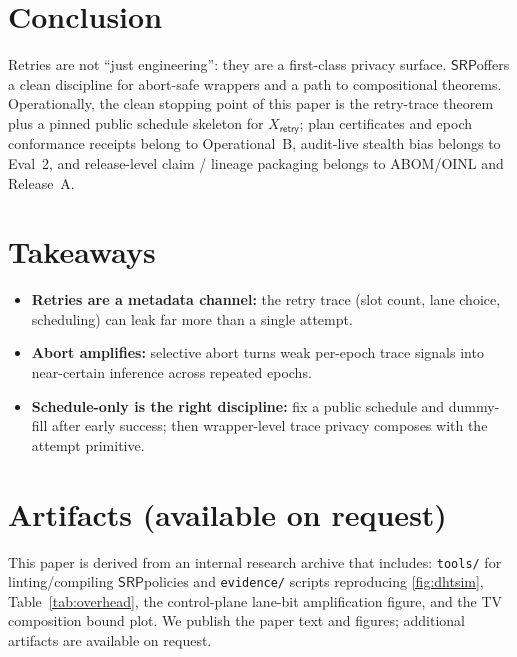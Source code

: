 \documentclass[11pt]{article}
\newcommand{\SRP}{\ensuremath{\mathsf{SRP}}}
\begin{document}
\section{Conclusion}
Retries are not ``just engineering'': they are a first-class privacy surface.
\SRP offers a clean discipline for abort-safe wrappers and a path to compositional theorems.
Operationally, the clean stopping point of this paper is the retry-trace theorem plus a pinned public schedule skeleton for $X_{\mathsf{retry}}$; plan certificates and epoch conformance receipts belong to Operational~B, audit-live stealth bias belongs to Eval~2, and release-level claim / lineage packaging belongs to ABOM/OINL and Release~A.\cite{series:operationalB,series:advantagecontracts,series:abomoinl,series:releaseproperty}

\section{Takeaways}
\begin{itemize}[leftmargin=*]
\item \textbf{Retries are a metadata channel:} the retry trace (slot count, lane choice, scheduling) can leak far more than a single attempt.
\item \textbf{Abort amplifies:} selective abort turns weak per-epoch trace signals into near-certain inference across repeated epochs.
\item \textbf{Schedule-only is the right discipline:} fix a public schedule and dummy-fill after early success; then wrapper-level trace privacy composes with the attempt primitive.
\end{itemize}

\section*{Artifacts (available on request)}
This paper is derived from an internal research archive that includes:
\texttt{tools/} for linting/compiling \SRP policies and \texttt{evidence/} scripts reproducing \cref{fig:dhtsim}, Table~\ref{tab:overhead}, the control-plane lane-bit amplification figure, and the TV composition bound plot.
We publish the paper text and figures; additional artifacts are available on request.
\end{document}
